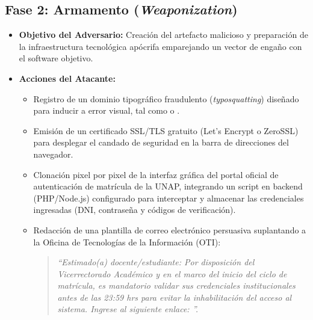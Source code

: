 \subsection*{Fase 2: Armamento (\textit{Weaponization})}
\begin{itemize}
    \item \textbf{Objetivo del Adversario:} Creación del artefacto malicioso y preparación de la infraestructura tecnológica apócrifa emparejando un vector de engaño con el software objetivo.
    \item \textbf{Acciones del Atacante:}
    \begin{itemize}
        \item Registro de un dominio tipográfico fraudulento (\textit{typosquatting}) diseñado para inducir a error visual, tal como  o .
        \item Emisión de un certificado SSL/TLS gratuito (Let's Encrypt o ZeroSSL) para desplegar el candado de seguridad en la barra de direcciones del navegador.
        \item Clonación pixel por pixel de la interfaz gráfica del portal oficial de autenticación de matrícula de la UNAP, integrando un script en backend (PHP/Node.js) configurado para interceptar y almacenar las credenciales ingresadas (DNI, contraseña y códigos de verificación).
        \item Redacción de una plantilla de correo electrónico persuasiva suplantando a la Oficina de Tecnologías de la Información (OTI):
        \begin{quote}
        \itshape ``Estimado(a) docente/estudiante: Por disposición del Vicerrectorado Académico y en el marco del inicio del ciclo de matrícula, es mandatorio validar sus credenciales institucionales antes de las 23:59 hrs para evitar la inhabilitación del acceso al sistema. Ingrese al siguiente enlace: ''.
        \end{quote}
    \end{itemize}
\end{itemize}

\newpage
